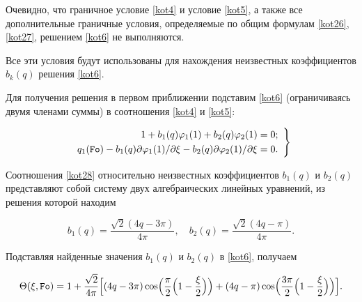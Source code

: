 Очевидно, что граничное условие \eqref{kot4} и условие \eqref{kot5}, а также все дополнительные граничные условия, определяемые по общим формулам \eqref{kot26}, \eqref{kot27}, решением \eqref{kot6} не выполняются.

Все эти условия будут использованы для нахождения неизвестных коэффициентов $b_k(q)$ решения \eqref{kot6}.



Для получения решения в первом приближении подставим \eqref{kot6} (ограничиваясь двумя членами суммы) в соотношения \eqref{kot4} и \eqref{kot5}:

\begin{equation}

\label{kot28}

\left.

\begin{array}{r}

{1+b_1(q)\varphi_1(1)+b_2(q)\varphi_2(1)=0;}

\\[1mm]

{q_1(\mbox{\tt Fo})-b_1(q)\partial\varphi_1(1)/\partial\xi-b_2(q)\partial\varphi_2(1)/\partial\xi=0.}

\end{array} 

\right\} 

\end{equation}



Соотношения \eqref{kot28} относительно неизвестных коэффициентов $b_1(q)$ и $b_2(q)$ представляют собой систему двух алгебраических линейных уравнений, из решения которой находим 

$$b_1(q)=\frac{\sqrt{2}(4q-3\pi)}{4\pi}, \quad b_2(q)=\frac{\sqrt{2}(4q-\pi)}{4\pi}.$$

Подставляя найденные значения $b_1(q)$ и $b_2(q)$ в \eqref{kot6}, получаем 

\begin{equation}

\label{kot29}

\Theta(\xi,\mbox{\tt Fo})=1+\frac{\sqrt{2}}{4\pi}

\Bigl[

(4q-3\pi)\cos\Bigl(\frac\pi2 \Bigl(1-\frac \xi2\Bigr)\Bigr)

+(4q-\pi)\cos\Bigl(\frac{3\pi}2 \Bigl(1-\frac\xi 2\Bigr)\Bigr)\Bigr].

\end{equation}



